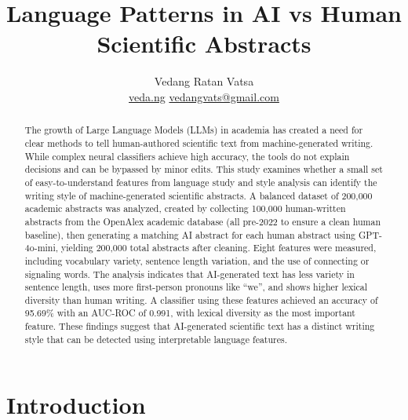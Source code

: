 \documentclass{article}
\title{Language Patterns in AI vs Human\\Scientific Abstracts}
\author{Vedang Ratan Vatsa \\
\href{https://veda.ng}{veda.ng} \textperiodcentered{} \href{mailto:vedangvats@gmail.com}{vedangvats@gmail.com}}
\begin{document}
\raggedbottom

\maketitle

\begin{abstract}
The growth of Large Language Models (LLMs) in academia has created a need for clear methods to tell human-authored scientific text from machine-generated writing. While complex neural classifiers achieve high accuracy, the tools do not explain decisions and can be bypassed by minor edits. This study examines whether a small set of easy-to-understand features from language study and style analysis can identify the writing style of machine-generated scientific abstracts. A balanced dataset of 200,000 academic abstracts was analyzed, created by collecting 100,000 human-written abstracts from the OpenAlex academic database (all pre-2022 to ensure a clean human baseline), then generating a matching AI abstract for each human abstract using GPT-4o-mini, yielding 200,000 total abstracts after cleaning. Eight features were measured, including vocabulary variety, sentence length variation, and the use of connecting or signaling words. The analysis indicates that AI-generated text has less variety in sentence length, uses more first-person pronouns like ``we'', and shows higher lexical diversity than human writing. A classifier using these features achieved an accuracy of 95.69\% with an AUC-ROC of 0.991, with lexical diversity as the most important feature. These findings suggest that AI-generated scientific text has a distinct writing style that can be detected using interpretable language features.
\end{abstract}

\section{Introduction}
\end{document}
